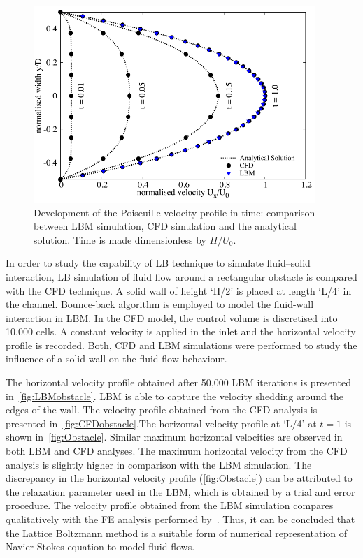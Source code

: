 \begin{figure}[tbhp]
	\centering
	\includegraphics[width=0.95\textwidth]{Poiseuille}
	\caption{Development of the Poiseuille velocity profile in time: comparison 
		between LBM simulation, CFD simulation and the analytical solution. 
		Time is 
		made dimensionless by $H/U_0$.}
	\label{fig:Pois}
\end{figure}

In order to study the capability of LB technique to simulate fluid--solid 
interaction, LB simulation of fluid flow around a rectangular obstacle is 
compared with the CFD technique. A solid wall of height `H/2' is placed at 
length `L/4' in the channel. Bounce-back algorithm is employed to model the 
fluid-wall interaction in LBM. In the CFD model, the control volume is 
discretised into 10,000 cells. A constant velocity is applied in the inlet and 
the horizontal velocity profile is recorded. Both, CFD and LBM simulations were 
performed to study the influence of a solid wall on the fluid flow behaviour.

The horizontal velocity profile obtained after 50,000 LBM iterations is 
presented in~\cref{fig:LBMobstacle}. LBM is able to capture the velocity 
shedding around the edges of the wall. The velocity profile obtained from the 
CFD analysis is presented in~\cref{fig:CFDobstacle}.The horizontal velocity 
profile at `L/4' at $t=1$ is shown in~\cref{fig:Obstacle}. Similar 
maximum horizontal velocities are observed in both LBM and CFD 
analyses. The maximum horizontal velocity from the CFD analysis is slightly 
higher in comparison with the LBM simulation. The discrepancy in the horizontal 
velocity profile (\cref{fig:Obstacle}) can be attributed to the relaxation 
parameter used in the LBM, which is obtained by a trial and error procedure. 
The velocity profile obtained from the LBM simulation compares qualitatively 
with the FE analysis performed by~\citet{Zhong1991}. Thus, it can be concluded 
that the Lattice Boltzmann method is a suitable form of numerical 
representation of Navier-Stokes equation to model fluid flows. 

